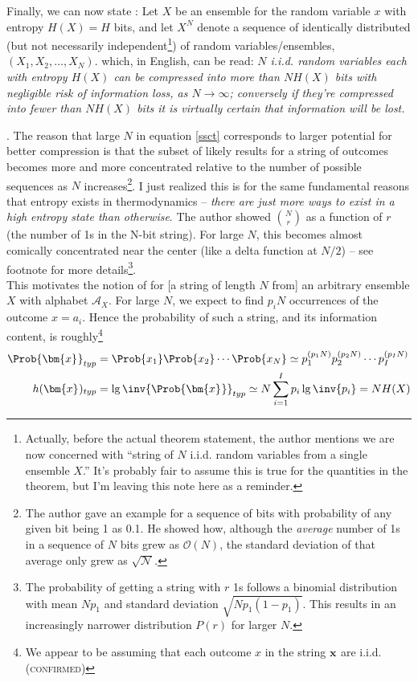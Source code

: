 \documentclass[11pt]{article}
\renewcommand\vec[2][]{\bm{#2}_{#1}}
\newcommand\myspace[1][]{\vspace{#1\bigskipamount}}
\newcommand\p{\Needspace{10\baselineskip} \noindent}
\begin{document}
Finally, we can now state : Let $X$ be an ensemble for the random variable $x$ with entropy $H(X) = H$ bits, and let $X^N$ denote a sequence of identically distributed (but not necessarily independent\footnote{Actually, before the actual theorem statement, the author mentions we are now concerned with ``string of $N$ i.i.d. random variables from a single ensemble $X$.'' It's probably fair to assume this is true for the quantities in the theorem, but I'm leaving this note here as a reminder.}) of random variables/ensembles, $(X_1, X_2, \ldots, X_N)$. 
which, in English, can be read: \textit{$N$ i.i.d. random variables each with entropy $H(X)$ can be compressed into more than $NH(X)$ bits with negligible risk of information loss, as $N \rightarrow \infty$; conversely if they're compressed into fewer than $NH(X)$ bits it is virtually certain that information will be lost.}

\myspace
\p {}. The reason that large $N$ in equation \ref{ssct} corresponds to larger potential for better compression is that the subset of likely results for a string of outcomes becomes more and more concentrated relative to the number of possible sequences as $N$ increases\footnote{The author gave an example for a sequence of bits with probability of any given bit being 1 as 0.1. He showed how, although the \textit{average} number of 1s in a sequence of $N$ bits grew as $\mathcal{O}(N)$, the standard deviation of that average only grew as $\mathcal{\sqrt{N}}$.}. I just realized this is for the same fundamental reasons that entropy exists in thermodynamics -- \textit{there are just more ways to exist in a high entropy state than otherwise}. The author showed $\binom{N}{r}$ as a function of $r$ (the number of 1s in the N-bit string). For large $N$, this becomes almost comically concentrated near the center (like a delta function at $N/2$) -- see footnote for more details\footnote{The probability of getting a string with $r$ 1s follows a binomial distribution with mean $Np_1$ and standard deviation $\sqrt{Np_1(1-p_1)}$. This results in an increasingly narrower distribution $P(r)$ for larger $N$.}. \\

\p This motivates the notion of  for [a string of length $N$ from] an arbitrary ensemble $X$ with alphabet $\mathcal{A}_X$. For large $N$, we expect to find $p_i N$ occurrences of the outcome $x = a_i$. Hence the probability of such a string, and its information content, is roughly\footnote{We appear to be assuming that each outcome $x$ in the string $\vec x$ are i.i.d. (\textsc{confirmed})}
\begin{align}
	\Prob{\vec{x}}_{typ} &= \Prob{x_1} \Prob{x_2} \cdots \Prob{x_N} \simeq p_1^{(p_1N)} p_2^{(p_2 N)} \cdots p_I^{(p_I N)} \\
	h(\vec x)_{typ} &= \lg \inv{\Prob{\vec x}}_{typ} \simeq N \sum_{i = 1}^I p_i \lg \inv{p_i}  = NH(X)
\end{align} 
\end{document}
